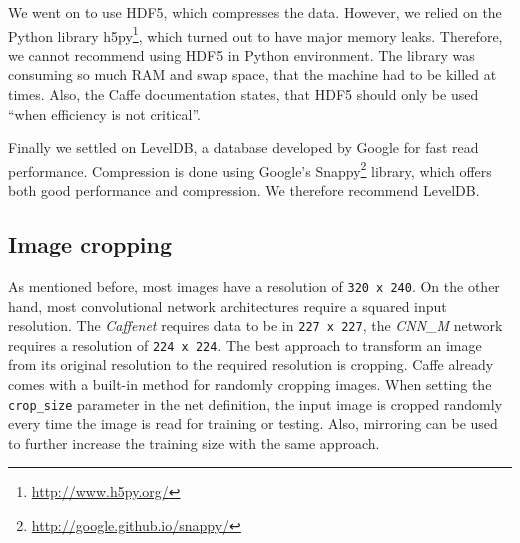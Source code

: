 We went on to use HDF5, which compresses the data.
However, we relied on the Python library h5py\footnote{\url{http://www.h5py.org/}}, which turned out to have major memory leaks.
Therefore, we cannot recommend using HDF5 in Python environment.
The library was consuming so much RAM and swap space, that the machine had to be killed at times.
Also, the Caffe documentation states, that HDF5 should only be used ``when efficiency is not critical''.

Finally we settled on LevelDB, a database developed by Google for fast read performance.
Compression is done using Google's Snappy\footnote{\url{http://google.github.io/snappy/}} library, which offers both good performance and compression.
We therefore recommend LevelDB.



\subsection{Image cropping}
As mentioned before, most images have a resolution of \texttt{320 x 240}.
On the other hand, most convolutional network architectures require a squared input resolution.
The \emph{Caffenet} requires data to be in \texttt{227 x 227}, the \emph{CNN\_M} network requires a resolution of \texttt{224 x 224}.
The best approach to transform an image from its original resolution to the required resolution is cropping.
Caffe already comes with a built-in method for randomly cropping images.
When setting the \texttt{crop\_size} parameter in the net definition, the input image is cropped randomly every time the image is read for training or testing.
Also, mirroring can be used to further increase the training size with the same approach.

